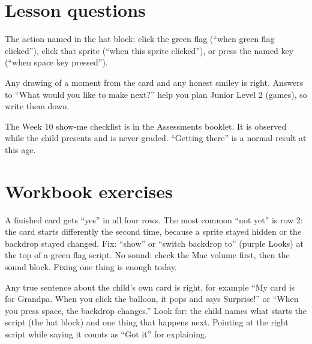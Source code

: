 
\section{Lesson questions}
\begin{answer}
The action named in the hat block: click the green flag (\enquote{when green flag clicked}), click that sprite (\enquote{when this sprite clicked}), or press the named key (\enquote{when space key pressed}).
\end{answer}

\begin{answer}[Reflection]
Any drawing of a moment from the card and any honest smiley is right. Answers to \enquote{What would you like to make next?} help you plan Junior Level 2 (games), so write them down.
\end{answer}

\begin{answer}
The Week 10 show-me checklist is in the Assessments booklet. It is observed while the child presents and is never graded. \enquote{Getting there} is a normal result at this age.
\end{answer}

\section{Workbook exercises}
\begin{answer}
A finished card gets \enquote{yes} in all four rows. The most common \enquote{not yet} is row 2: the card starts differently the second time, because a sprite stayed hidden or the backdrop stayed changed. Fix: \enquote{show} or \enquote{switch backdrop to} (purple Looks) at the top of a green flag script. No sound: check the Mac volume first, then the sound block. Fixing one thing is enough today.
\end{answer}

\begin{answer}
Any true sentence about the child's own card is right, for example \enquote{My card is for Grandpa. When you click the balloon, it pops and says Surprise!} or \enquote{When you press space, the backdrop changes.} Look for: the child names what starts the script (the hat block) and one thing that happens next. Pointing at the right script while saying it counts as \enquote{Got it} for explaining.
\end{answer}

